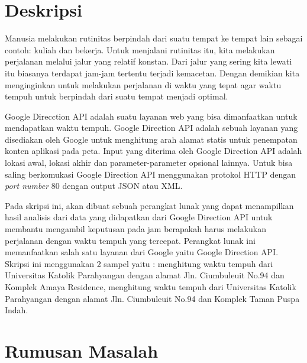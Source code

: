 \documentclass[a4paper,twoside]{article}
\begin{document}
\title{\@judultopik}
\author{\nama \textendash \@npm} 

\newcommand{\nama}{Frasetiawan Hidayat}
\newcommand{\@npm}{2010730121}
\newcommand{\@judultopik}{Analisis Waktu Tempuh Kota Bandung} %
\newcommand{\jumpemb}{1} %
\newcommand{\tanggal}{16/02/2017}
\maketitle


\section{Deskripsi}
Manusia melakukan rutinitas berpindah dari suatu tempat ke tempat lain sebagai contoh: kuliah dan bekerja. Untuk menjalani rutinitas itu, kita melakukan perjalanan melalui jalur yang relatif konstan. Dari jalur yang sering kita lewati itu biasanya terdapat jam-jam tertentu terjadi kemacetan. Dengan demikian kita menginginkan untuk melakukan perjalanan di waktu yang tepat agar waktu tempuh untuk berpindah dari suatu tempat menjadi optimal.

Google Direcction API adalah suatu layanan web yang bisa dimanfaatkan untuk mendapatkan waktu tempuh. Google Direction API adalah sebuah layanan yang disediakan oleh Google untuk menghitung arah alamat statis untuk penempatan konten aplikasi pada peta. Input yang diterima oleh Google Direction API adalah lokasi awal, lokasi akhir dan parameter-parameter opsional lainnya. Untuk bisa saling berkomukasi Google Direction API menggunakan protokol HTTP dengan \textit{port number} 80 dengan output JSON atau XML.

Pada skripsi ini, akan dibuat sebuah perangkat lunak yang dapat menampilkan hasil analisis dari data yang didapatkan dari Google Direction API untuk membantu mengambil keputusan pada jam berapakah harus melakukan perjalanan dengan waktu tempuh yang tercepat. Perangkat lunak ini memanfaatkan salah satu layanan dari Google yaitu Google Direction API. Skripsi ini menggunakan 2 sampel yaitu : menghitung waktu tempuh dari Universitas Katolik Parahyangan dengan alamat Jln. Ciumbuleuit No.94 dan Komplek Amaya Residence, menghitung waktu tempuh dari Universitas Katolik Parahyangan dengan alamat Jln. Ciumbuleuit No.94 dan Komplek Taman Puspa Indah.

\section{Rumusan Masalah}
\end{document}

